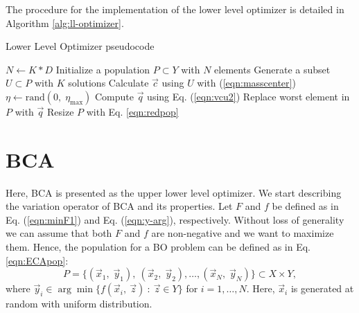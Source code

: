 \documentclass[conference]{IEEEtran}
\begin{document}
The procedure for the implementation of the lower level optimizer is detailed in
Algorithm \ref{alg:ll-optimizer}.
% 
\begin{algorithm}[!ht]
    \caption{Lower Level Optimizer pseudocode}
    \label{alg:ll-optimizer}
    \begin{algorithmic}[1]
        \STATE $N \gets K*D$
        \STATE Initialize a population $P \subset Y$ with $N$ elements
                \STATE Generate a subset $U \subset P$ with $K$ solutions
                \STATE Calculate $\vec{c}$ using $U$ with (\ref{eqn:masscenter})
                \STATE $\eta \gets \text{rand}(0,\; \eta_{\max}) $ 
                \STATE Compute $\vec{q}$ using Eq. (\ref{eqn:vcu2})
                    \STATE Replace worst element in $P$ with $\vec{q}$
                \ENDIF
            \ENDFOR
            \STATE Resize $P$ with Eq. \ref{eqn:redpop}
        \ENDWHILE
    \end{algorithmic}
\end{algorithm}




\section{BCA} %
\label{sec:bca}

Here, BCA is presented as the upper lower level optimizer. We start describing the
variation operator of BCA and its properties. Let $F$ and $f$ be 
defined as in Eq. (\ref{eqn:minF1}) and Eq. (\ref{eqn:y-arg}), respectively.
Without loss of generality we can assume that both $F$ and $f$ are non-negative
and we want to maximize them. Hence, the population for a BO problem can be
defined as in Eq. \ref{eqn:ECApop}: 
\begin{equation}
    P = \{ (\vec{x}_1,\; \vec{y}_1), \ (\vec{x}_2,\; \vec{y}_2), \ldots,
           (\vec{x}_N,\; \vec{y}_N)
         \}
         \subset X \times Y,
        \label{eqn:ECApop}
\end{equation}
where $\vec{y}_i \in \arg \min \{ f(\vec{x}_i, \ \vec{z}) \ : \ \vec{z} \in Y \}$
for $i = 1,\ldots,N$. Here, $\vec{x}_i$ is generated at random with uniform distribution.
% 
\end{document}
